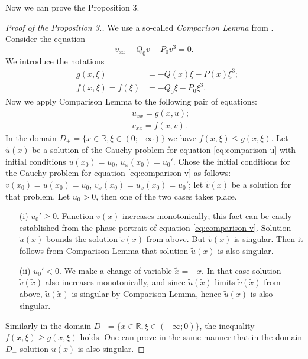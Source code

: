 Now we can prove the Proposition 3.
\begin{proof}[Proof of the Proposition 3.]
	We use a so-called {\it Comparison Lemma} from \cite[Appendix C]{AlfimovZezyulin}.
	Consider the equation
	\begin{equation}
		v_{xx} + Q_0 v + P_0 v^3 = 0.
	\end{equation}
	We introduce the notations
	\begin{eqnarray}
		& g(x, \xi) & = -Q(x) \xi - P(x) \xi^3; \\
		& f(x, \xi) = f(\xi) & = -Q_0 \xi - P_0 \xi^3.
	\end{eqnarray}
	Now we apply Comparison Lemma to the following pair of equations:
	\begin{eqnarray}
		&& u_{xx} = g(x, u) \label{eq:comparison-u}; \\
		&& v_{xx} = f(x, v) \label{eq:comparison-v}.
	\end{eqnarray}
	In the domain $D_+ = \{ x \in \mathbb{R}, \xi \in (0; +\infty) \}$ we have $f(x, \xi) \le g(x, \xi)$.
	Let $\widetilde{u}(x)$ be a solution of the Cauchy problem for equation \eqref{eq:comparison-u} with initial conditions $u(x_0) = u_0$, $u_x(x_0) = u_0'$.
	Chose the initial conditions for the Cauchy problem for equation \eqref{eq:comparison-v} as follows: $v(x_0) = u(x_0) = u_0$, $v_x(x_0) = u_x(x_0) = u_0'$; let $\widetilde{v}(x)$ be a solution for that problem.
	Let $u_0 > 0$, then one of the two cases takes place.
	\begin{enumerate}
		\item[(i)] $u_0' \ge 0$.
		Function $\widetilde{v}(x)$ increases monotonically; this fact can be easily established from the phase portrait of equation \eqref{eq:comparison-v}.
		Solution $\widetilde{u}(x)$ bounds the solution $\widetilde{v}(x)$ from above.
		But $\widetilde{v}(x)$ is singular.
		Then it follows from Comparison Lemma that solution $\widetilde{u}(x)$ is also singular.
		\item[(ii)] $u_0' < 0$.
		We make a change of variable $\widetilde{x} = -x$.
		In that case solution $\widetilde{v}(\widetilde{x})$ also increases monotonically, and since $\widetilde{u}(\widetilde{x})$ limits $\widetilde{v}(\widetilde{x})$ from above, $\widetilde{u}(\widetilde{x})$ is singular by Comparison Lemma, hence $\widetilde{u}(x)$ is also singular.
	\end{enumerate}
	Similarly in the domain $D_- = \{ x \in \mathbb{R}, \xi \in (-\infty; 0) \}$, the inequality $f(x, \xi) \ge g(x, \xi)$ holds.
	One can prove in the same manner that in the domain $D_-$ solution $u(x)$ is also singular.
\end{proof}

